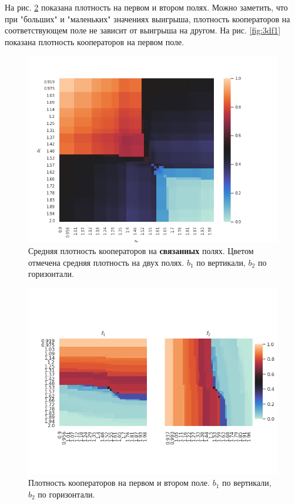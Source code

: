 \documentclass[12pt]{article}
\begin{document}
        На рис. \ref{fig:twoden} показана плотность на первом и втором полях. Можно заметить, что при "больших" и "маленьких" значениях выигрыша, плотность кооператоров на соответствующем поле не зависит от выигрыша на другом. На рис. \ref{fig:3df1} показана плотность кооператоров на первом поле.
        \begin{figure}[H]
            \centering
            \includegraphics[width=0.7\columnwidth, keepaspectratio=True]{DoubleField/right.png}
            \caption{Средняя плотность кооператоров на \textbf{связанных} полях. Цветом отмечена средняя плотность на двух полях. $b_1$ по вертикали, $b_2$ по горизонтали.}
            \label{fig:right}
        \end{figure}
        \begin{figure}[H]
            \centering
            \includegraphics[width=0.95\columnwidth, keepaspectratio=True]{DoubleField/twodensity.png}
            \caption{Плотность кооператоров на первом и втором поле. $b_1$ по вертикали, $b_2$ по горизонтали.}
            \label{fig:twoden}
        \end{figure}
        
\end{document}
